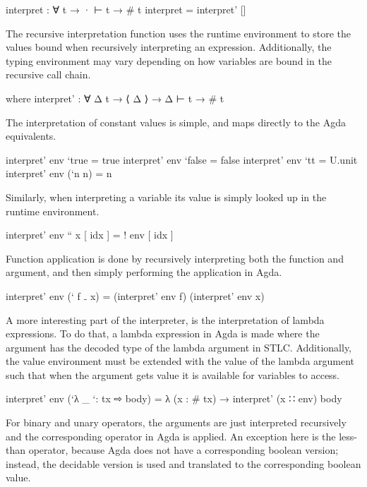 \documentclass{article}
\begin{document}
\begin{code}
  interpret : ∀ {t} → · ⊢ t → # t
  interpret = interpret' []
\end{code}

The recursive interpretation function uses the runtime environment to store the values bound when recursively interpreting an expression. Additionally, the typing environment
may vary depending on how variables are bound in the recursive call chain.

\begin{code}
    where interpret' : ∀ {Δ t} → ⟨ Δ ⟩ → Δ ⊢ t → # t
\end{code}

The interpretation of constant values is simple, and maps directly to the Agda equivalents.

\begin{code}
          interpret' env `true = true
          interpret' env `false = false
          interpret' env `tt = U.unit
          interpret' env (`n n) = n
\end{code}

Similarly, when interpreting a variable its value is simply looked up in the runtime environment.

\begin{code}
          interpret' env `` x [ idx ] = ! env [ idx ]
\end{code}

Function application is done by recursively interpreting both the function and argument, and then simply performing the application in Agda.

\begin{code}
           interpret' env (` f ₋ x) = (interpret' env f) (interpret' env x)
\end{code}

A more interesting part of the interpreter, is the interpretation of lambda expressions. To do that, a lambda expression in Agda is made where the argument
has the decoded type of the lambda argument in STLC. Additionally, the value environment must be extended with the value of the lambda argument such that
when the argument gets value it is available for variables to access.

\begin{code}
           interpret' env (`λ _ `: tx ⇨ body) 
              = λ (x : # tx) → interpret' (x ∷ env) body
\end{code}

For binary and unary operators, the arguments are just interpreted recursively and the corresponding operator in Agda is applied. An exception here is the less-than operator,
because Agda does not have a corresponding boolean version; instead, the decidable version is used and translated to the corresponding boolean value.
\end{document}

